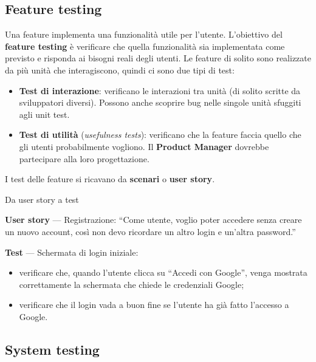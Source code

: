 \subsection{Feature testing}\label{feature-testing}

Una feature implementa una funzionalità utile per l'utente. L'obiettivo
del \textbf{feature testing} è verificare che quella funzionalità sia
implementata come previsto e risponda ai bisogni reali degli utenti. Le
feature di solito sono realizzate da più unità che interagiscono, quindi
ci sono due tipi di test:

\begin{itemize}
\tightlist
\item
  \textbf{Test di interazione}: verificano le interazioni tra unità (di
  solito scritte da sviluppatori diversi). Possono anche scoprire bug
  nelle singole unità sfuggiti agli unit test.
\item
  \textbf{Test di utilità} (\emph{usefulness tests}): verificano che la
  feature faccia quello che gli utenti probabilmente vogliono. Il
  \textbf{Product Manager} dovrebbe partecipare alla loro progettazione.
\end{itemize}

I test delle feature si ricavano da \textbf{scenari} o \textbf{user
story}.

\begin{boxexample}{Da user story a test}

\textbf{User story} --- Registrazione: ``Come utente, voglio poter
accedere senza creare un nuovo account, così non devo ricordare un altro
login e un'altra password.''

\textbf{Test} --- Schermata di login iniziale:

\begin{itemize}
\tightlist
\item
  verificare che, quando l'utente clicca su ``Accedi con Google'', venga
  mostrata correttamente la schermata che chiede le credenziali Google;
\item
  verificare che il login vada a buon fine se l'utente ha già fatto
  l'accesso a Google.
\end{itemize}

\end{boxexample}

\subsection{System testing}\label{system-testing}

